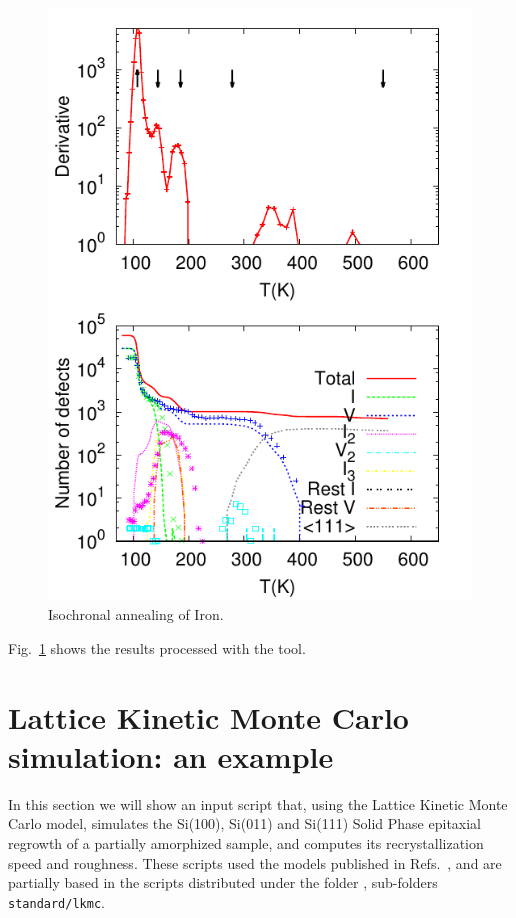 \begin{figure}
\includegraphics{images/Fe}
\caption{Isochronal annealing of Iron. \cite{MARTIN-BRAGADO-CPC13}}
\label{fig:isochronalFe}
\end{figure}


Fig.~\ref{fig:isochronalFe} shows the results processed with the  tool.



\section{Lattice Kinetic Monte Carlo simulation: an example}

In this section we will show an input script that, using the Lattice Kinetic Monte Carlo model, simulates the Si(100), Si(011) and Si(111) Solid Phase epitaxial regrowth of a partially amorphized sample, and computes its recrystallization speed and roughness. These scripts used the models published in Refs.~\cite{MARTIN-BRAGADO-APL09,MARTIN-BRAGADO-APL11,MARTIN-BRAGADO-SM12,MARTIN-BRAGADO-JAP12}, and are partially based in the scripts distributed under the folder , sub-folders {\tt standard/lkmc}.

